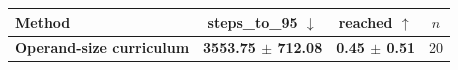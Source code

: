 \begin{tabular}{lccc}
\toprule
Method & steps\_to\_95 $\downarrow$ & reached $\uparrow$ & $n$ \\
\midrule
\textbf{Operand-size curriculum} & \textbf{3553.75 $\pm$ 712.08} & \textbf{0.45 $\pm$ 0.51} & 20 \\
\bottomrule
\end{tabular}
